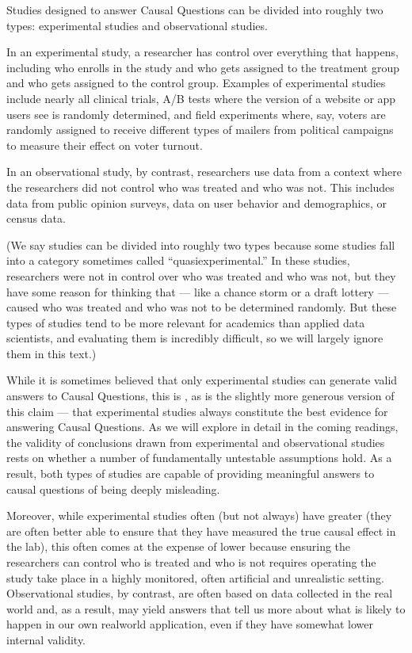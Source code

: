 \documentclass[letterpaper,10pt,english]{jupyterBook}
\begin{document}
\sphinxAtStartPar
Studies designed to answer Causal Questions can be divided into roughly two types: experimental studies and observational studies.

\sphinxAtStartPar
In an experimental study, a researcher has control over everything that happens, including who enrolls in the study and who gets assigned to the treatment group and who gets assigned to the control group. Examples of experimental studies include nearly all clinical trials, A/B tests where the version of a website or app users see is randomly determined, and field experiments where, say, voters are randomly assigned to receive different types of mailers from political campaigns to measure their effect on voter turnout.

\sphinxAtStartPar
In an observational study, by contrast, researchers use data from a context where the researchers did not control who was treated and who was not. This includes data from public opinion surveys, data on user behavior and demographics, or census data.

\sphinxAtStartPar
(We say studies can be divided into roughly two types because some studies fall into a category sometimes called “quasi\sphinxhyphen{}experimental.” In these studies, researchers were not in control over who was treated and who was not, but they have some reason for thinking that  — like a chance storm or a draft lottery — caused who was treated and who was not to be determined randomly. But these types of studies tend to be more relevant for academics than applied data scientists, and evaluating them is incredibly difficult, so we will largely ignore them in this text.)

\sphinxAtStartPar
While it is sometimes believed that only experimental studies can generate valid answers to Causal Questions, this is , as is the slightly more generous version of this claim — that experimental studies always constitute the best evidence for answering Causal Questions. As we will explore in  detail in the coming readings, the validity of conclusions drawn from  experimental and observational studies rests on whether a number of fundamentally untestable assumptions hold. As a result, both types of studies are capable of providing meaningful answers to causal questions  of being deeply misleading.

\sphinxAtStartPar
Moreover, while experimental studies often (but not always) have greater  (they are often better able to ensure that they have measured the true causal effect in the lab), this often comes at the expense of lower  because ensuring the researchers can control who is treated and who is not requires operating the study take place in a highly monitored, often artificial and unrealistic setting. Observational studies, by contrast, are often based on data collected in the real world and, as a result, may yield answers that tell us more about what is likely to happen in our own real\sphinxhyphen{}world application, even if they have somewhat lower internal validity.
\end{document}
